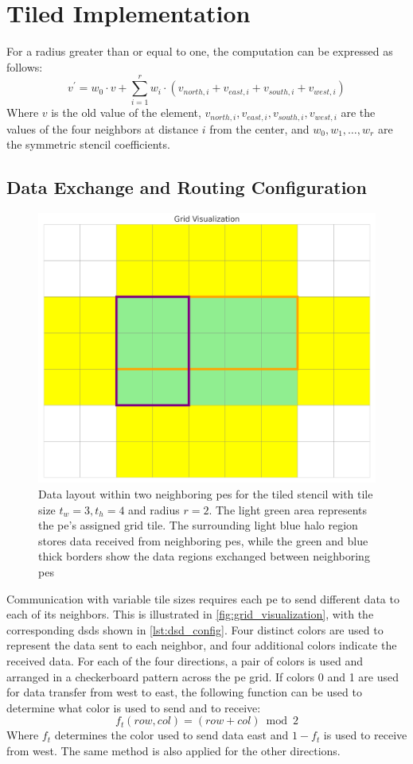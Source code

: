 \section{Tiled Implementation}
For a radius greater than or equal to one, the computation can be expressed as follows:
\begin{equation}
    \label{eq:stencil_computation_tiled}
    v^{'} = w_0 \cdot v + \sum_{i=1}^{r} w_i \cdot (v_{north,i} + v_{east,i} + v_{south,i} + v_{west,i})
\end{equation}
Where $v$ is the old value of the element, $v_{north,i}, v_{east,i}, v_{south,i}, v_{west,i}$ are the values of the four neighbors at distance $i$ from the center, and $w_0, w_1, \dots, w_r$ are the symmetric stencil coefficients.

\subsection{Data Exchange and Routing Configuration}
\begin{figure}
    \centering
    \includegraphics[width=0.5\linewidth]{grid_visualization.png}
    \caption{Data layout within two neighboring \acp{pe} for the tiled stencil with tile size $t_w=3, t_h=4$ and radius $r=2$. The light green area represents the \ac{pe}'s assigned grid tile. The surrounding light blue halo region stores data received from neighboring \acp{pe}, while the green and blue thick borders show the data regions exchanged between neighboring \acp{pe}}
    \label{fig:grid_visualization}
\end{figure}
Communication with variable tile sizes requires each \ac{pe} to send different data to each of its neighbors. This is illustrated in \autoref{fig:grid_visualization}, with the corresponding \acp{dsd} shown in \autoref{lst:dsd_config}. Four distinct colors are used to represent the data sent to each neighbor, and four additional colors indicate the received data.
For each of the four directions, a pair of colors is used and arranged in a checkerboard pattern across the \ac{pe} grid.
If colors 0 and 1 are used for data transfer from west to east, the following function can be used to determine what color is used to send and to receive:
\begin{equation}
    \label{eq:tiled_coloring_function}
    f_t(row, col)=(row+col) \bmod 2
\end{equation}
Where $f_t$ determines the color used to send data east and $1-f_t$ is used to receive from west. The same method is also applied for the other directions.

